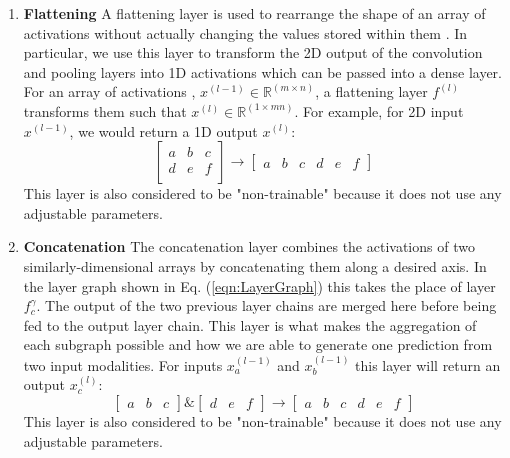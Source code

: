\documentclass[conference,onecolumn,letterpaper]{IEEEtran}
\begin{document}
\begin{enumerate}
\item\textbf{Flattening}
A flattening layer is used to rearrange the shape of an array of activations without actually changing the values stored within them \cite{Tensorflow}. In particular, we use this layer to transform the 2D output of the convolution and pooling layers into 1D activations which can be passed into a dense layer. For an array of activations , $x^{(l-1)} \in \mathbb{R}^{(m \times n)}$, a flattening layer $f^{(l)}$ transforms them such that $x^{(l)} \in \mathbb{R}^{(1 \times mn)}$. For example, for 2D input $x^{(l-1)}$, we would return a 1D output $x^{(l)}$:
\begin{equation}
\label{eqn:FlattenCall}
\begin{bmatrix}
a & b & c \\
d & e & f \\
\end{bmatrix}
\rightarrow
\begin{bmatrix}
a & b & c & d & e & f 
\end{bmatrix}
\end{equation}
This layer is also considered to be "non-trainable" because it does not use any adjustable parameters.

\item\textbf{Concatenation}
The concatenation layer combines the activations of two similarly-dimensional arrays by concatenating them along a desired axis. In the layer graph shown in Eq. (\ref{eqn:LayerGraph}) this takes the place of layer $f_c^{\gamma}$. The output of the two previous layer chains are merged here before being fed to the output layer chain. This layer is what makes the aggregation of each subgraph possible and how we are able to generate one prediction from two input modalities. For inputs $x_a^{(l-1)}$ and $x_b^{(l-1)}$ this layer will return an output $x_c^{(l)}$:
\begin{equation}
\label{eqn:ConcatCall}
\begin{bmatrix}
a & b & c
\end{bmatrix}
\&
\begin{bmatrix}
d & e & f
\end{bmatrix}
\rightarrow
\begin{bmatrix}
a & b & c & d & e & f
\end{bmatrix}
\end{equation}
This layer is also considered to be "non-trainable" because it does not use any adjustable parameters.
\end{enumerate}
\end{document}
